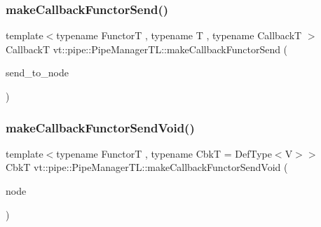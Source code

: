 \mbox{\label{structvt_1_1pipe_1_1_pipe_manager_t_l_a2e9eb336fb5e2f6927b64068411ff2c8}} 
\subsubsection{\texorpdfstring{make\+Callback\+Functor\+Send()}{makeCallbackFunctorSend()}\hspace{0.1cm}{\footnotesize\ttfamily [2/2]}}
{\footnotesize\ttfamily template$<$typename FunctorT , typename T , typename CallbackT $>$ \\
CallbackT vt\+::pipe\+::\+Pipe\+Manager\+T\+L\+::make\+Callback\+Functor\+Send (\begin{DoxyParamCaption}\item[{\hyperlink{namespacevt_a866da9d0efc19c0a1ce79e9e492f47e2}{Node\+Type} const \&}]{send\+\_\+to\+\_\+node }\end{DoxyParamCaption})}

\mbox{\label{structvt_1_1pipe_1_1_pipe_manager_t_l_ac2c128da30637e0672086df5abea84a3}} 
\subsubsection{\texorpdfstring{make\+Callback\+Functor\+Send\+Void()}{makeCallbackFunctorSendVoid()}\hspace{0.1cm}{\footnotesize\ttfamily [1/2]}}
{\footnotesize\ttfamily template$<$typename FunctorT , typename CbkT  = Def\+Type$<$\+V$>$$>$ \\
CbkT vt\+::pipe\+::\+Pipe\+Manager\+T\+L\+::make\+Callback\+Functor\+Send\+Void (\begin{DoxyParamCaption}\item[{\hyperlink{namespacevt_a866da9d0efc19c0a1ce79e9e492f47e2}{Node\+Type} const \&}]{node }\end{DoxyParamCaption})}

